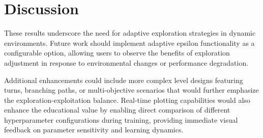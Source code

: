 \section{Discussion}

These results underscore the need for adaptive exploration strategies in dynamic environments. Future work should implement adaptive epsilon functionality as a configurable option, allowing users to observe the benefits of exploration adjustment in response to environmental changes or performance degradation.

Additional enhancements could include more complex level designs featuring turns, branching paths, or multi-objective scenarios that would further emphasize the exploration-exploitation balance. Real-time plotting capabilities would also enhance the educational value by enabling direct comparison of different hyperparameter configurations during training, providing immediate visual feedback on parameter sensitivity and learning dynamics.